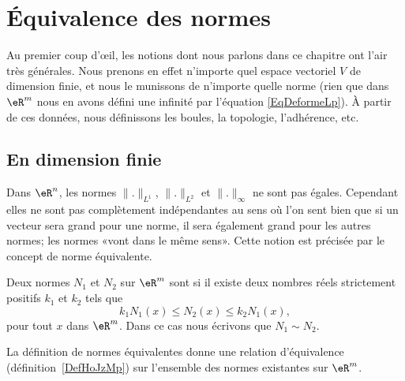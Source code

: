 \section{Équivalence des normes}
\label{normes_equiv}

Au premier coup d'œil, les notions dont nous parlons dans ce chapitre ont l'air très générales. Nous prenons en effet n'importe quel espace vectoriel \( V\) de dimension finie, et nous le munissons de n'importe quelle norme (rien que dans \( \eR^m\) nous en avons défini une infinité par l'équation \eqref{EqDeformeLp}). À partir de ces données, nous définissons les boules, la topologie, l'adhérence, etc.

\subsection{En dimension finie}

Dans \( \eR^n\), les normes $\| . \|_{L^1}$, $\| . \|_{L^2}$ et $\| . \|_{\infty}$ ne sont pas égales. Cependant elles ne sont pas complètement indépendantes au sens où l'on sent bien que si un vecteur sera grand pour une norme, il sera également grand pour les autres normes; les normes «vont dans le même sens». Cette notion est précisée par le concept de norme équivalente.

\begin{definition}      \label{DefEquivNorm}
    Deux normes $N_1$ et $N_2$ sur $\eR^m$ sont  si il existe deux nombres réels strictement positifs $k_1$ et $k_2$ tels que
    \begin{equation}
        k_1N_1(x)\leq N_2(x)\leq k_2 N_1(x),
    \end{equation}
    pour tout $x$ dans $\eR^m$. Dans ce cas nous écrivons que $N_1\sim N_2$.
\end{definition}

\begin{lemma}       \label{LEMooHAITooWdtLAN}
    La définition de normes équivalentes donne une relation d'équivalence (définition~\ref{DefHoJzMp}) sur l'ensemble des normes existantes sur $\eR^m$.
\end{lemma}

